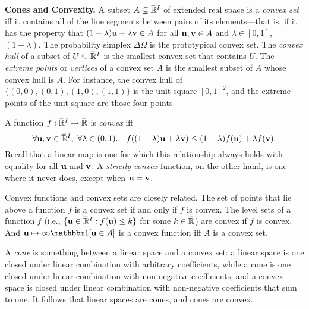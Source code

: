\textbf{Cones and Convexity.}
A subset $A \subseteq \mskip1mu\overline{\mskip-1mu\mathbb R\!}\,^I$ of extended real space is a \emph{convex set} iff
it contains all of the line segments between pairs of its elements---that is, if
it has the property that
$
(1-\lambda) \mathbf u + \lambda \mathbf v \in A
$
for all $\mathbf u, \mathbf v \in A$ and $\lambda \in [0,1]$,
$(1-\lambda)$.
The probability simplex $\Delta \Omega$ is the prototypical convex set. 
The \emph{convex hull} of a subset of $U \subseteq \mskip1mu\overline{\mskip-1mu\mathbb R\!}\,^I$ is the smallest convex set that contains $U$. 
The \emph{extreme points} or \emph{vertices} of a convex set $A$ is the smallest subset 
of $A$ whose convex hull is $A$. 
For instance, the convex hull of $\{ (0,0), (0,1), (1,0), (1,1) \}$
is the unit square $[0,1]^2$, and the extreme points of the unit square are those four points. 

%
A function $f : \mskip1mu\overline{\mskip-1mu\mathbb R\!}\,^I \to \mskip1mu\overline{\mskip-1mu\mathbb R\!}\,$ is \emph{convex} iff
\[
    \forall \mathbf u, \mathbf v \in \mskip1mu\overline{\mskip-1mu\mathbb R\!}\,^I,~\forall \lambda \in (0,1).\quad
    f( (1-\lambda) \mathbf u + \lambda \mathbf v ) \le (1-\lambda) f(\mathbf u) + \lambda f(\mathbf v).
\]
Recall that a linear map is one for which this relationship always holds with equality for all $\mathbf u$ and $\mathbf v$. 
A \emph{strictly convex} function, on the other hand, is one where it never does, except when $\mathbf u = \mathbf v$. 

Convex functions and convex sets are closely related. The set of points that lie above a function $f$
is a convex set if and only if $f$ is convex. The level sets of a function $f$ (i.e., $\{ \mathbf u \in \mskip1mu\overline{\mskip-1mu\mathbb R\!}\,^I : f(\mathbf u) \le k \}$ for some $k \in \mskip1mu\overline{\mskip-1mu\mathbb R\!}\,$) are convex if $f$ is convex. And $\mat u \mapsto \infty \mathbbm 1[\mat u \in A]$ is a convex function iff $A$ is a convex set. 

A \emph{cone} is something between a linear space and a convex set: a linear space is one closed under linear combination with arbitrary coefficients, while a cone is one closed under linear combination with non-negative coefficients, and a convex space is closed under linear combination with non-negative coefficients that sum to one.
It follows that linear spaces are cones, and cones are convex.



